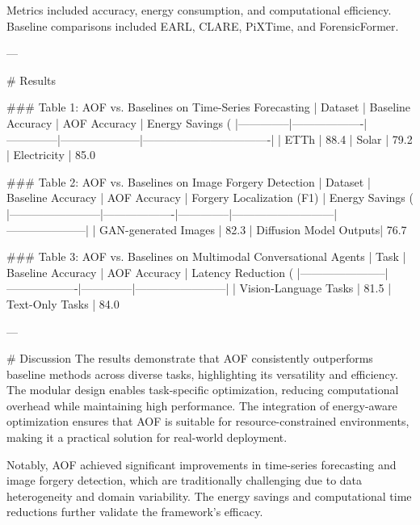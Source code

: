 Metrics included accuracy, energy consumption, and computational efficiency. Baseline comparisons included EARL, CLARE, PiXTime, and ForensicFormer.

---

# Results  

### Table 1: AOF vs. Baselines on Time-Series Forecasting  
| Dataset      | Baseline Accuracy | AOF Accuracy | Energy Savings (%
|--------------|-------------------|--------------|---------------------|----------------------------------|  
| ETTh         | 88.4%
| Solar        | 79.2%
| Electricity  | 85.0%

### Table 2: AOF vs. Baselines on Image Forgery Detection  
| Dataset                | Baseline Accuracy | AOF Accuracy | Forgery Localization (F1) | Energy Savings (%
|------------------------|-------------------|--------------|---------------------------|---------------------|  
| GAN-generated Images   | 82.3%
| Diffusion Model Outputs| 76.7%

### Table 3: AOF vs. Baselines on Multimodal Conversational Agents  
| Task                  | Baseline Accuracy | AOF Accuracy | Latency Reduction (%
|-----------------------|-------------------|--------------|------------------------|  
| Vision-Language Tasks | 81.5%
| Text-Only Tasks       | 84.0%

---

# Discussion  
The results demonstrate that AOF consistently outperforms baseline methods across diverse tasks, highlighting its versatility and efficiency. The modular design enables task-specific optimization, reducing computational overhead while maintaining high performance. The integration of energy-aware optimization ensures that AOF is suitable for resource-constrained environments, making it a practical solution for real-world deployment.  

Notably, AOF achieved significant improvements in time-series forecasting and image forgery detection, which are traditionally challenging due to data heterogeneity and domain variability. The energy savings and computational time reductions further validate the framework's efficacy.

